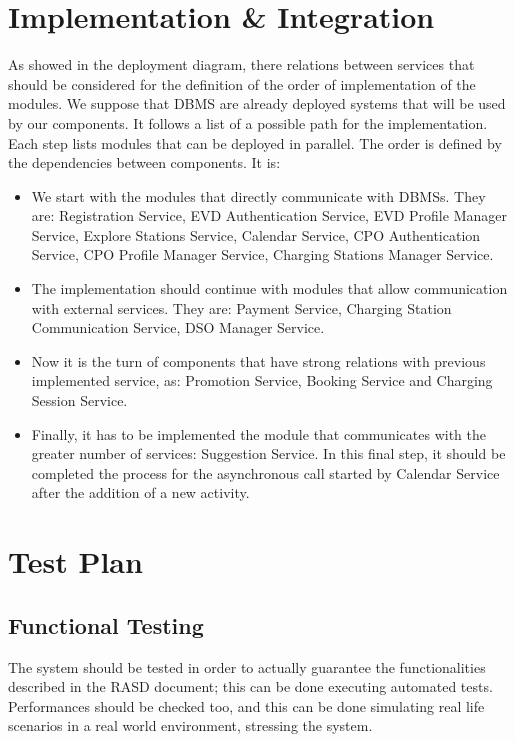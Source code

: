 \section{Implementation \& Integration}
\label{sec: implementation}%
As showed in the deployment diagram, there relations between services that should be considered for the definition of
the order of implementation of the modules.
We suppose that DBMS are already deployed systems that will be used by our components.
It follows a list of a possible path for the implementation.
Each step lists modules that can be deployed in parallel.
The order is defined by the dependencies between components.
It is:
\begin{itemize}
    \item We start with the modules that directly communicate with DBMSs. They are: Registration Service,
    EVD Authentication Service, EVD Profile Manager Service, Explore Stations Service, Calendar Service, CPO Authentication Service,
    CPO Profile Manager Service, Charging Stations Manager Service.
    \item The implementation should continue with modules that allow communication with external services.
    They are: Payment Service, Charging Station Communication Service, DSO Manager Service.
    \item Now it is the turn of components that have strong relations with previous implemented service, as:
    Promotion Service, Booking Service and Charging Session Service.
    \item Finally, it has to be implemented the module that communicates with the greater number of services: Suggestion Service.
    In this final step, it should be completed the process for the asynchronous call started by Calendar Service
    after the addition of a new activity.
\end{itemize}


\section{Test Plan}
\label{sec: test_plan}%
\subsection{Functional Testing}
The system should be tested in order to actually guarantee the functionalities described in the RASD document; this can be done executing automated tests.
Performances should be checked too, and this can be done simulating real life scenarios in a real world environment, stressing the system.
